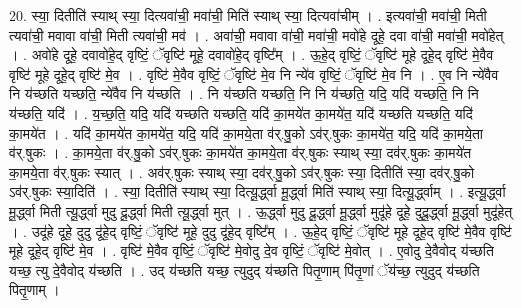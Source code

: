 \documentclass[17pt]{extarticle}
\begin{document}
20. स्या॒ दितीति॑ स्याथ् स्या॒ दित्यवा॑ची॒ मवा॑ची॒ मिति॑ स्याथ् स्या॒ दित्यवा॑चीम् । . इत्यवा॑ची॒ मवा॑ची॒ मिती त्यवा॑ची॒ मवावा वा॑ची॒ मिती त्यवा॑ची॒ मव॑ । . अवा॑ची॒ मवावा वा॑ची॒ मवा॑ची॒ मवो॑हे दूहे॒ दवा वा॑ची॒ मवा॑ची॒ मवो॑हेत् । . अवो॑हे दूहे॒ दवावो॑हे॒द् वृष्टिं॒ ॅवृष्टि॑ मूहे॒ दवावो॑हे॒द् वृष्टि᳚म् । . ऊ॒हे॒द् वृष्टिं॒ ॅवृष्टि॑ मूहे दूहे॒द् वृष्टि॑ मे॒वैव वृष्टि॑ मूहे दूहे॒द् वृष्टि॑ मे॒व । . वृष्टि॑ मे॒वैव वृष्टिं॒ ॅवृष्टि॑ मे॒व नि न्ये॑व वृष्टिं॒ ॅवृष्टि॑ मे॒व नि । . ए॒व नि न्ये॑वैव नि य॑च्छति यच्छति॒ न्ये॑वैव नि य॑च्छति । . नि य॑च्छति यच्छति॒ नि नि य॑च्छति॒ यदि॒ यदि॑ यच्छति॒ नि नि य॑च्छति॒ यदि॑ । . य॒च्छ॒ति॒ यदि॒ यदि॑ यच्छति यच्छति॒ यदि॑ का॒मये॑त का॒मये॑त॒ यदि॑ यच्छति यच्छति॒ यदि॑ का॒मये॑त । . यदि॑ का॒मये॑त का॒मये॑त॒ यदि॒ यदि॑ का॒मये॒ता व॑र्.षु॒को ऽव॑र्.षुकः का॒मये॑त॒ यदि॒ यदि॑ का॒मये॒ता व॑र्.षुकः । . का॒मये॒ता व॑र्.षु॒को ऽव॑र्.षुकः का॒मये॑त का॒मये॒ता व॑र्.षुकः स्याथ् स्या॒ दव॑र्.षुकः का॒मये॑त का॒मये॒ता व॑र्.षुकः स्यात् । . अव॑र्.षुकः स्याथ् स्या॒ दव॑र्.षु॒को ऽव॑र्.षुकः स्या॒ दितीति॑ स्या॒ दव॑र्.षु॒को ऽव॑र्.षुकः स्या॒दिति॑ । . स्या॒ दितीति॑ स्याथ् स्या॒ दित्यू॒र्द्ध्वा मू॒र्द्ध्वा मिति॑ स्याथ् स्या॒ दित्यू॒र्द्ध्वाम् । . इत्यू॒र्द्ध्वा मू॒र्द्ध्वा मिती त्यू॒र्द्ध्वा मुदु दू॒र्द्ध्वा मिती त्यू॒र्द्ध्वा मुत् । . ऊ॒र्द्ध्वा मुदु दू॒र्द्ध्वा मू॒र्द्ध्वा मुदू॑हे दूहे॒ दुदू॒र्द्ध्वा मू॒र्द्ध्वा मुदू॑हेत् । . उदू॑हे दूहे॒ दुदु दू॑हे॒द् वृष्टिं॒ ॅवृष्टि॑ मूहे॒ दुदु दू॑हे॒द् वृष्टि᳚म् । . ऊ॒हे॒द् वृष्टिं॒ ॅवृष्टि॑ मूहे दूहे॒द् वृष्टि॑ मे॒वैव वृष्टि॑ मूहे दूहे॒द् वृष्टि॑ मे॒व । . वृष्टि॑ मे॒वैव वृष्टिं॒ ॅवृष्टि॑ मे॒वोदु दे॒व वृष्टिं॒ ॅवृष्टि॑ मे॒वोत् । . ए॒वोदु दे॒वैवोद् य॑च्छति यच्छ॒ त्यु दे॒वैवोद् य॑च्छति । . उद् य॑च्छति यच्छ॒ त्युदुद् य॑च्छति पितृ॒णाम् पि॑तृ॒णां ॅय॑च्छ॒ त्युदुद् य॑च्छति पितृ॒णाम् । \newline
\end{document}
